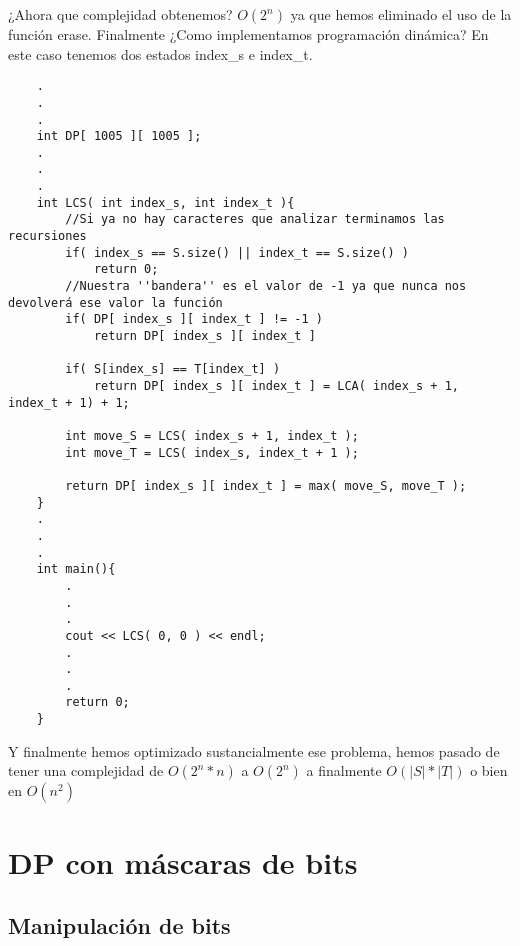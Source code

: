 ¿Ahora que complejidad obtenemos? $O(2^{n})$ ya que hemos eliminado el uso de la función erase. Finalmente ¿Como implementamos programación dinámica? En este caso tenemos dos estados index\_s e index\_t.

\begin{lstlisting}
    .
    .
    .
    int DP[ 1005 ][ 1005 ];
    .
    .
    .
    int LCS( int index_s, int index_t ){
        //Si ya no hay caracteres que analizar terminamos las recursiones
        if( index_s == S.size() || index_t == S.size() )
            return 0;
        //Nuestra ''bandera'' es el valor de -1 ya que nunca nos devolverá ese valor la función
        if( DP[ index_s ][ index_t ] != -1 )
            return DP[ index_s ][ index_t ]
        
        if( S[index_s] == T[index_t] )
            return DP[ index_s ][ index_t ] = LCA( index_s + 1, index_t + 1) + 1;
        
        int move_S = LCS( index_s + 1, index_t );
        int move_T = LCS( index_s, index_t + 1 );

        return DP[ index_s ][ index_t ] = max( move_S, move_T );
    }
    .
    .
    .
    int main(){
        .
        .
        .
        cout << LCS( 0, 0 ) << endl;
        .
        .
        .
        return 0;
    }
\end{lstlisting}

Y finalmente hemos optimizado sustancialmente ese problema, hemos pasado de tener una complejidad de $O(2^{n} * n)$ a $O(2^{n})$ a finalmente $O(|S|*|T|)$ o bien en $O(n^{2})$

\chapter{DP con máscaras de bits}
\section{Manipulación de bits}

